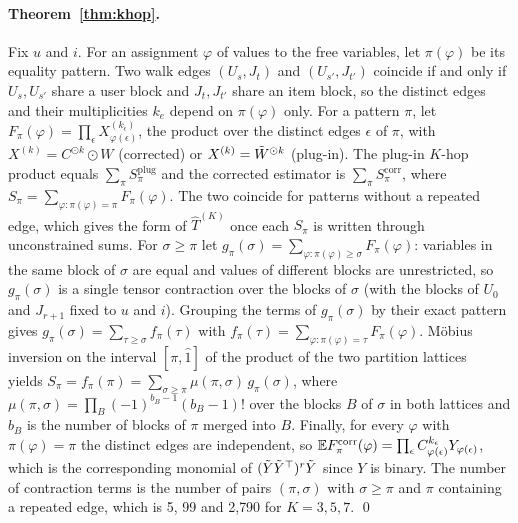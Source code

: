 \paragraph{Theorem~\ref{thm:khop}.}
Fix $u$ and $i$. For an assignment $\varphi$ of values to the free variables, let
$\pi(\varphi)$ be its equality pattern. Two walk edges $(U_s,J_t)$ and
$(U_{s'},J_{t'})$ coincide if and only if $U_s,U_{s'}$ share a user block and
$J_t,J_{t'}$ share an item block, so the distinct edges and their
multiplicities $k_e$ depend on $\pi(\varphi)$ only. For a pattern $\pi$, let
$F_\pi(\varphi)=\prod_\epsilon X^{(k_\epsilon)}_{\varphi(\epsilon)}$, the product over the
distinct edges $\epsilon$ of $\pi$, with $X^{(k)}=C^{\odot k}\odot W$ (corrected) or
$X^{(k)}=\tilde W^{\odot k}$ (plug-in). The plug-in $K$-hop product equals
$\sum_\pi S^{\mathrm{plug}}_\pi$ and the corrected estimator is
$\sum_\pi S^{\mathrm{corr}}_\pi$, where $S_\pi=\sum_{\varphi:\pi(\varphi)=\pi}F_\pi(\varphi)$. The two
coincide for patterns without a repeated edge, which gives the form of
$\hat T^{(K)}$ once each $S_\pi$ is written through unconstrained sums. For
$\sigma\ge\pi$ let $g_\pi(\sigma)=\sum_{\varphi:\pi(\varphi)\ge\sigma}F_\pi(\varphi)$: variables in the
same block of $\sigma$ are equal and values of different blocks are unrestricted,
so $g_\pi(\sigma)$ is a single tensor contraction over the blocks of $\sigma$ (with
the blocks of $U_0$ and $J_{r+1}$ fixed to $u$ and $i$). Grouping the terms of
$g_\pi(\sigma)$ by their exact pattern gives $g_\pi(\sigma)=\sum_{\tau\ge\sigma}f_\pi(\tau)$ with
$f_\pi(\tau)=\sum_{\varphi:\pi(\varphi)=\tau}F_\pi(\varphi)$. Möbius inversion on the interval
$[\pi,\hat1]$ of the product of the two partition lattices~\cite{rota1964} yields
$S_\pi=f_\pi(\pi)=\sum_{\sigma\ge\pi}\mu(\pi,\sigma)\,g_\pi(\sigma)$, where
$\mu(\pi,\sigma)=\prod_{B}(-1)^{b_B-1}(b_B-1)!$ over the blocks $B$ of $\sigma$ in both
lattices and $b_B$ is the number of blocks of $\pi$ merged into $B$. Finally, for
every $\varphi$ with $\pi(\varphi)=\pi$ the distinct edges are independent, so
$\mathbb{E} F^{\mathrm{corr}}_\pi(\varphi)=\prod_\epsilon C_{\varphi(\epsilon)}^{k_\epsilon}Y_{\varphi(\epsilon)}$, which is the
corresponding monomial of $(\tilde Y\tilde Y^\top)^r\tilde Y$ since $Y$ is binary. The number of
contraction terms is the number of pairs $(\pi,\sigma)$ with $\sigma\ge\pi$ and $\pi$
containing a repeated edge, which is 5, 99 and 2{,}790 for $K=3,5,7$. \qed

